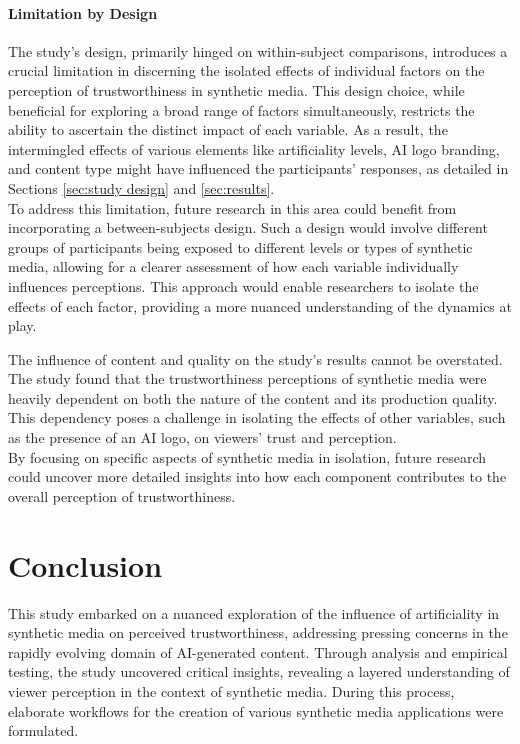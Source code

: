 \documentclass[
  a4paper,  %
  twoside,  %
  bibliography=totoc,
  headsepline,
  cleardoublepage=empty,
  parskip=half,
  draft=false
]{scrbook}
\begin{document}
\subsubsection{Limitation by Design}
The study's design, primarily hinged on within-subject comparisons, introduces a crucial limitation in discerning the isolated effects of individual factors on the perception of trustworthiness in synthetic media. This design choice, while beneficial for exploring a broad range of factors simultaneously, restricts the ability to ascertain the distinct impact of each variable. As a result, the intermingled effects of various elements like artificiality levels, AI logo branding, and content type might have influenced the participants' responses, as detailed in Sections \ref{sec:study design} and \ref{sec:results}. \\
To address this limitation, future research in this area could benefit from incorporating a between-subjects design. Such a design would involve different groups of participants being exposed to different levels or types of synthetic media, allowing for a clearer assessment of how each variable individually influences perceptions. This approach would enable researchers to isolate the effects of each factor, providing a more nuanced understanding of the dynamics at play.

The influence of content and quality on the study's results cannot be overstated. The study found that the trustworthiness perceptions of synthetic media were heavily dependent on both the nature of the content and its production quality. This dependency poses a challenge in isolating the effects of other variables, such as the presence of an AI logo, on viewers' trust and perception. \\
By focusing on specific aspects of synthetic media in isolation, future research could uncover more detailed insights into how each component contributes to the overall perception of trustworthiness.

\chapter{Conclusion}
\label{chap:conclusion}

This study embarked on a nuanced exploration of the influence of artificiality in synthetic media on perceived trustworthiness, addressing pressing concerns in the rapidly evolving domain of AI-generated content. Through analysis and empirical testing, the study uncovered critical insights, revealing a layered understanding of viewer perception in the context of synthetic media. During this process, elaborate workflows for the creation of various synthetic media applications were formulated.
\end{document}
